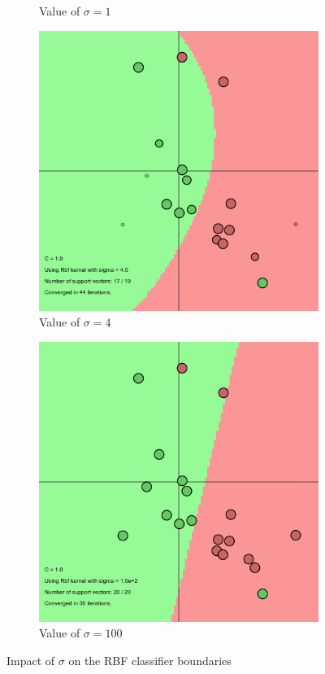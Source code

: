 \documentclass[11pt, a4paper]{article}
\begin{document}
\begin{figure}[H]
\begin{subfigure}{.25\textwidth}
      \caption{Value of $\sigma = 1$}
      \label{fig:rbfs2}
    \end{subfigure}%
    \begin{subfigure}{.25\textwidth}
      \centering
      \includegraphics[width=0.9\linewidth]{1-2-1-kernel_ssigma4.png}
      \caption{Value of $\sigma = 4$}
      \label{fig:rbfs3}
    \end{subfigure}%
    \begin{subfigure}{.25\textwidth}
      \centering
      \includegraphics[width=0.9\linewidth]{1-2-1-kernel_ssigma100.png}
      \caption{Value of $\sigma = 100$}
      \label{fig:rfbs4}
    \end{subfigure}
    \caption{Impact of $\sigma$ on the RBF classifier boundaries}
    \label{fig:RBF_sigma}
\end{figure}
\end{document}
